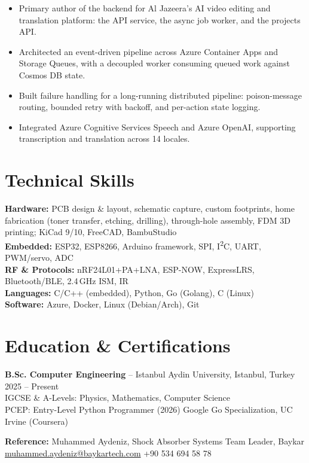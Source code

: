 \documentclass[10pt,a4paper]{article}
\begin{document}
\begin{itemize}
    \item Primary author of the backend for Al Jazeera's AI video editing and
    translation platform: the API service, the async job worker, and the
    projects API.
    \item Architected an event-driven pipeline across Azure Container Apps and
    Storage Queues, with a decoupled worker consuming queued work against
    Cosmos DB state.
    \item Built failure handling for a long-running distributed pipeline:
    poison-message routing, bounded retry with backoff, and per-action state logging.
    \item Integrated Azure Cognitive Services Speech and Azure OpenAI, supporting
    transcription and translation across 14 locales.
\end{itemize}

\section*{Technical Skills}
\textbf{Hardware:} PCB design \& layout, schematic capture, custom footprints, home fabrication (toner transfer, etching, drilling), through-hole assembly, FDM 3D printing; KiCad 9/10, FreeCAD, BambuStudio\\
\textbf{Embedded:} ESP32, ESP8266, Arduino framework, SPI, I\textsuperscript{2}C, UART, PWM/servo, ADC\\
\textbf{RF \& Protocols:} nRF24L01+PA+LNA, ESP-NOW, ExpressLRS, Bluetooth/BLE, 2.4\,GHz ISM, IR\\
\textbf{Languages:} C/C++ (embedded), Python, Go (Golang), C (Linux)\\
\textbf{Software:} Azure, Docker, Linux (Debian/Arch), Git

\section*{Education \& Certifications}
\textbf{B.Sc. Computer Engineering} -- Istanbul Aydin University, Istanbul, Turkey \hfill 2025 -- Present\\
IGCSE \& A-Levels: Physics, Mathematics, Computer Science\\
PCEP: Entry-Level Python Programmer (2026) \textbar{} Google Go Specialization, UC Irvine (Coursera)

\vspace{4pt}
\textbf{Reference:} Muhammed Aydeniz, Shock Absorber Systems Team Leader, Baykar\\
\href{mailto:muhammed.aydeniz@baykartech.com}{muhammed.aydeniz@baykartech.com} \textbar{} +90 534 694 58 78
\end{document}
